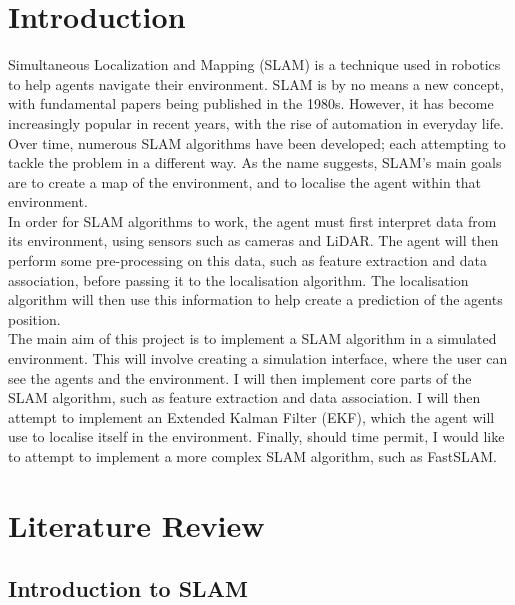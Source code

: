 \documentclass[12pt]{article}
\begin{document}
\section{Introduction}
Simultaneous Localization and Mapping (SLAM) is a technique used in robotics to help agents navigate their environment. SLAM is
by no means a new concept, with fundamental papers being published in the 1980s. However, it has become increasingly popular
in recent years, with the rise of automation in everyday life. Over time, numerous SLAM algorithms have been developed; each
attempting to tackle the problem in a different way. As the name suggests, SLAM's main goals are to create a map of the environment,
and to localise the agent within that environment.\\
In order for SLAM algorithms to work, the agent must first interpret data from its environment, using sensors such as cameras and LiDAR.
The agent will then perform some pre-processing on this data, such as feature extraction and data association, before passing it to the
localisation algorithm. The localisation algorithm will then use this information
to help create a prediction of the agents position.\\
The main aim of this project is to implement a SLAM algorithm in a simulated environment. This will involve creating a simulation
interface, where the user can see the agents and the environment. I will then implement core parts of the SLAM algorithm, such as
feature extraction and data association. I will then attempt to implement an Extended Kalman Filter (EKF), which the agent will use
to localise itself in the environment. Finally, should time permit, I would like to attempt to implement a more complex SLAM algorithm,
such as FastSLAM.\\




\section{Literature Review} %

\subsection{Introduction to SLAM} %
\end{document}
